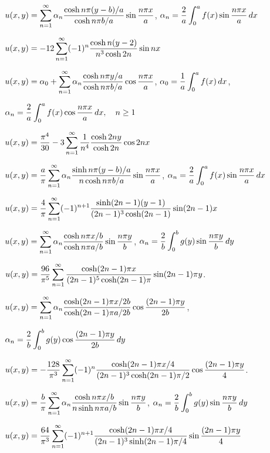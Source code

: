 $\displaystyle u(x,y)=\sum_{n=1}^{\infty}\alpha_{n}\frac{\cosh n\pi(y-b)/a}{\cosh n\pi b/a}\sin
\frac{n\pi x}{a}$, \quad
$\displaystyle\alpha_{n}=\frac{2}{a}\int_{0}^{a}f(x)\sin
\frac{n\pi x}{a}\,dx$

\quad \quad$u(x,y)=\displaystyle-12\sum_{n=1}^{\infty}(-1)^{n}\frac{\cosh n(y-2)}{n^{3}\cosh2n}
\sin nx$

$\displaystyle u(x,y)=\alpha_{0}+\sum_{n=1}^{\infty}\alpha_{n}\frac{\cosh n\pi y/a}{\cosh n\pi b/a}\cos
\frac{n\pi x}{a}$,
$\displaystyle\alpha_{0}=\frac{1}{a}\int_{0}^{a}f(x)\,dx$,

\quad \quad$\displaystyle\alpha_{n}=\frac{2}{a}\int_{0}^{a}f(x)\cos
\frac{n\pi x}{a}\,dx,\quad n\ge1$

\quad \quad$\displaystyle u(x,y)=\frac{\pi^{4}}{30}-3\sum_{n=1}^{\infty}\frac{1}{n^{4}}\frac{\cosh2ny}{\cosh2n}\cos2nx$

$\displaystyle u(x,y)=\frac{a}{\pi}\sum_{n=1}^{\infty}\alpha_{n}\frac{\sinh n\pi
(y-b)/a}{n\cosh n\pi b/a}\sin
\frac{n\pi x}{a}$, \quad
$\displaystyle\alpha_{n}=\frac{2}{a}\int_{0}^{a}
f(x)\sin\frac{n\pi x}{a}\,dx$

\quad \quad$u(x,y)=\displaystyle\frac{4}{\pi}\sum_{n=1}^{\infty}(-1)^{n+1}
\frac{\sinh(2n-1)(y-1)}{(2n-1)^{3}\cosh(2n-1)}
\sin(2n-1)x$

$\displaystyle u(x,y)=\sum_{n=1}^{\infty}\alpha_{n}\frac{\cosh n\pi x/b}{\cosh n\pi a/b}
\sin\frac{n\pi y}{b}$,\quad
$\displaystyle\alpha_{n}=\frac{2}{b}\int_{0}^{b}g(y)\sin
\frac{n\pi y}{b}\,dy$

\quad \quad$u(x,y)=\displaystyle\frac{96}{\pi^{5}}\sum_{n=1}^{\infty}\frac{\cosh(2n-1)\pi x}{(2n-1)^{5}\cosh(2n-1)\pi}\sin(2n-1)\pi y$.

$\displaystyle u(x,y)=\sum_{n=1}^{\infty}\alpha_{n}\frac{\cosh(2n-1)\pi x/2b}{\cosh(2n-1)\pi a/2b}
\cos\frac{(2n-1)\pi y}{2b}$,\quad

\quad \quad$\displaystyle\alpha_{n}=\frac{2}{b}\int_{0}^{b}g(y)\cos
\frac{(2n-1)\pi y}{2b}\,dy$

\quad \quad$u(x,y)=-\displaystyle
\frac{128}{\pi^{3}}\sum_{n=1}^{\infty}(-1)^{n}\frac{\cosh(2n-1)\pi x/4}{(2n-1)^{3}\cosh(2n-1)\pi/2}\cos\frac{(2n-1)\pi y}{4}$.

$\displaystyle u(x,y)=\frac{b}{\pi}\sum_{n=1}^{\infty}\alpha_{n}
\frac{\cosh n\pi x/b}{n\sinh n\pi a/b}
\sin\frac{n\pi y}{b}$,\quad
$\displaystyle\alpha_{n}=\frac{2}{b}\int_{0}^{b}g(y)\sin
\frac{n\pi y}{b}\,dy$

\quad \quad$u(x,y)=\displaystyle\frac{64}{\pi^{3}}\sum_{n=1}^{\infty}(-1)^{n+1}
\frac{\cosh(2n-1)\pi x/4}{(2n-1)^{3}\sinh(2n-1)\pi/4}
\sin\frac{(2n-1)\pi y}{4}$

